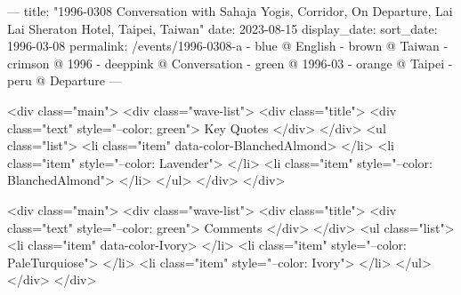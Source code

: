 ---
title: "1996-0308 Conversation with Sahaja Yogis, Corridor, On Departure, Lai Lai Sheraton Hotel, Taipei, Taiwan"
date: 2023-08-15
display_date: 
sort_date: 1996-03-08
permalink: /events/1996-0308-a
  - blue @ English
  - brown @ Taiwan
  - crimson @ 1996
  - deeppink @ Conversation
  - green @ 1996-03 
  - orange @ Taipei
  - peru @ Departure
---

<div class="main">
  <div class="wave-list">
    <div class="title">
      <div class="text" style="--color: green">
        Key Quotes
      </div>
    </div>
    <ul class="list">
        <li class="item" data-color-BlanchedAlmond>
        </li>
        <li class="item" style="--color: Lavender">
        </li>
        <li class="item" style="--color: BlanchedAlmond">
        </li>
      </ul>
  </div>
</div>

<div class="main">
  <div class="wave-list">
    <div class="title">
      <div class="text" style="--color: green">
        Comments
      </div>
    </div>
    <ul class="list">
        <li class="item" data-color-Ivory>
        </li>
        <li class="item" style="--color: PaleTurquiose">
        </li>
        <li class="item" style="--color: Ivory">
        </li>
      </ul>
  </div>
</div>